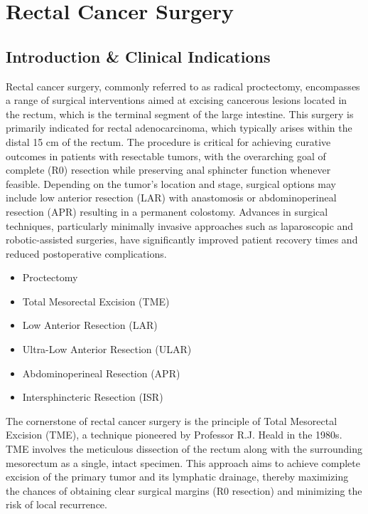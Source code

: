 \chapter{Rectal Cancer Surgery}

\section*{Introduction \& Clinical Indications}
Rectal cancer surgery, commonly referred to as radical proctectomy, encompasses a range of surgical interventions aimed at excising cancerous lesions located in the rectum, which is the terminal segment of the large intestine. This surgery is primarily indicated for rectal adenocarcinoma, which typically arises within the distal 15 cm of the rectum. The procedure is critical for achieving curative outcomes in patients with resectable tumors, with the overarching goal of complete (R0) resection while preserving anal sphincter function whenever feasible. Depending on the tumor's location and stage, surgical options may include low anterior resection (LAR) with anastomosis or abdominoperineal resection (APR) resulting in a permanent colostomy. Advances in surgical techniques, particularly minimally invasive approaches such as laparoscopic and robotic-assisted surgeries, have significantly improved patient recovery times and reduced postoperative complications.

\begin{itemize}
  \item Proctectomy
  \item Total Mesorectal Excision (TME)
  \item Low Anterior Resection (LAR)
  \item Ultra-Low Anterior Resection (ULAR)
  \item Abdominoperineal Resection (APR)
  \item Intersphincteric Resection (ISR)
\end{itemize}

The cornerstone of rectal cancer surgery is the principle of Total Mesorectal Excision (TME), a technique pioneered by Professor R.J. Heald in the 1980s. TME involves the meticulous dissection of the rectum along with the surrounding mesorectum as a single, intact specimen. This approach aims to achieve complete excision of the primary tumor and its lymphatic drainage, thereby maximizing the chances of obtaining clear surgical margins (R0 resection) and minimizing the risk of local recurrence.

